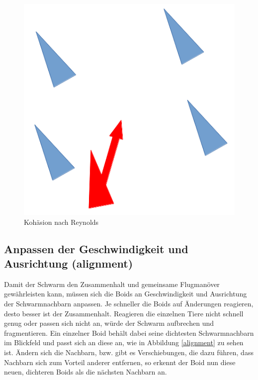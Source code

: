 \documentclass[draft=false
              ,paper=a4
              ,twoside=false
              ,fontsize=11pt
              ,headsepline
              ,BCOR10mm
              ,DIV11
              ,bibtotoc
              ,liststotoc
              ]{scrbook}
\begin{document}
\begin{figure}[!h]
\centering
\includegraphics[scale=0.4]{project/cohesion.png}
\caption{Kohäsion nach Reynolds \cite{reynolds87}}
\label{cohesion}
\end{figure}

\subsection{Anpassen der Geschwindigkeit und Ausrichtung (alignment)}
Damit der Schwarm den Zusammenhalt und gemeinsame Flugmanöver gewährleisten kann, müssen sich die Boids an Geschwindigkeit und Ausrichtung der Schwarmnachbarn anpassen. Je schneller die Boids auf Änderungen reagieren, desto besser ist der Zusammenhalt. Reagieren die einzelnen Tiere nicht schnell genug oder passen sich nicht an, würde der Schwarm aufbrechen und fragmentieren. Ein einzelner Boid behält dabei seine dichtesten Schwarmnachbarn im Blickfeld und passt sich an diese an, wie in Abbildung \ref{alignment} zu sehen ist. Ändern sich die Nachbarn, bzw. gibt es Verschiebungen, die dazu führen, dass Nachbarn sich zum Vorteil anderer entfernen, so erkennt der Boid nun diese neuen, dichteren Boids als die nächsten Nachbarn an.
\end{document}
